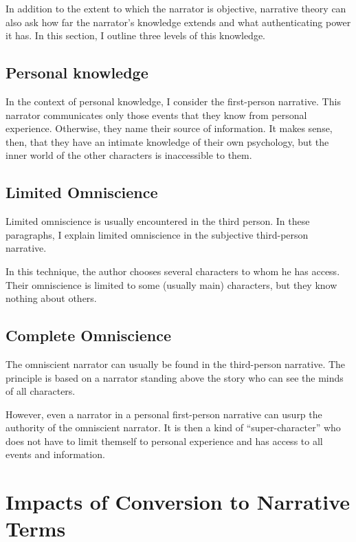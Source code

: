 In addition to the extent to which the narrator is objective, narrative theory can also ask how far the narrator's knowledge extends and what authenticating power it has. In this section, I outline three levels of this knowledge.

\subsection{Personal knowledge}

In the context of personal knowledge, I consider the first-person narrative. This narrator communicates only those events that they know from personal experience. Otherwise, they name their source of information. It makes sense, then, that they have an intimate knowledge of their own psychology, but the inner world of the other characters is inaccessible to them. \cite{dolezel-narativni-zpusoby}

\subsection{Limited Omniscience}

Limited omniscience is usually encountered in the third person. In these paragraphs, I explain limited omniscience in the subjective third-person narrative.

In this technique, the author chooses several characters to whom he has access. Their omniscience is limited to some (usually main) characters, but they know nothing about others. \cite{docekalova}

\subsection{Complete Omniscience}

The omniscient narrator can usually be found in the third-person narrative. The principle is based on a narrator standing above the story who can see the minds of all characters. \cite{docekalova}

However, even a narrator in a personal first-person narrative can usurp the authority of the omniscient narrator. It is then a kind of ``super-character'' who does not have to limit themself to personal experience and has access to all events and information. \cite{dolezel-narativni-zpusoby}


\section{Impacts of Conversion to Narrative Terms}

